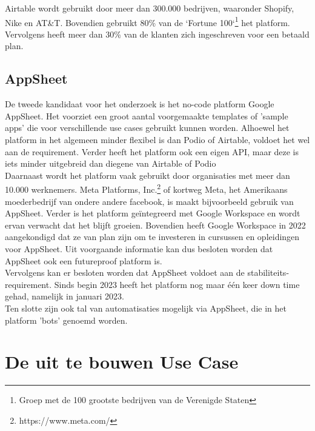 Airtable wordt gebruikt door meer dan 300.000 bedrijven, waaronder Shopify, Nike en AT\&T. Bovendien gebruikt 80\% van de `Fortune 100`\footnote{Groep met de 100 grootste bedrijven van de Verenigde Staten} het platform. Vervolgens heeft meer dan 30\% van de klanten zich ingeschreven voor een betaald plan. \\


\subsection{AppSheet} %

De tweede kandidaat voor het onderzoek is het no-code platform Google AppSheet. Het voorziet een groot aantal voorgemaakte templates of 'sample apps' die voor verschillende use cases gebruikt kunnen worden. Alhoewel het platform in het algemeen minder flexibel is dan Podio of Airtable, voldoet het wel aan de requirement. Verder heeft het platform ook een eigen API, maar deze is iets minder uitgebreid dan diegene van Airtable of Podio \\

Daarnaast wordt het platform vaak gebruikt door organisaties met meer dan 10.000 werknemers. Meta Platforms, Inc.\footnote{https://www.meta.com/} of kortweg Meta, het Amerikaans moederbedrijf van ondere andere facebook, is maakt bijvoorbeeld gebruik van AppSheet. Verder is het platform geïntegreerd met Google Workspace en wordt ervan verwacht dat het blijft groeien. Bovendien heeft Google Workspace in 2022 aangekondigd dat ze van plan zijn om te investeren in cursussen en opleidingen voor AppSheet. Uit voorgaande informatie kan dus besloten worden dat AppSheet ook een futureproof platform is. \\ 

Vervolgens kan er besloten worden dat AppSheet voldoet aan de stabiliteits-requirement. Sinds begin 2023 heeft het platform nog maar één keer down time gehad, namelijk in januari 2023. \\

Ten slotte zijn ook tal van automatisaties mogelijk via AppSheet, die in het platform 'bots' genoemd worden. \\


\section{De uit te bouwen Use Case}

